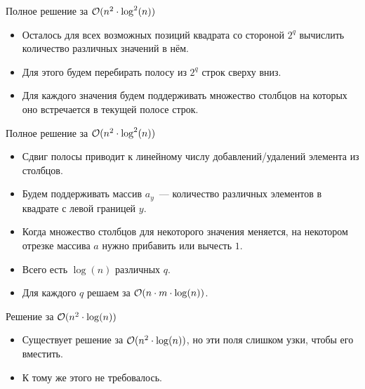 \begin{frame}{Полное решение за $\mathcal{O}(n ^ 2 \cdot \log^2(n))$}
  \begin{itemize}
  \item Осталось для всех возможных позиций квадрата со стороной $2^q$ вычислить количество различных значений в нём.
  \item Для этого будем перебирать полосу из $2^q$ строк сверху вниз.
  \item Для каждого значения будем поддерживать множество столбцов на которых оно встречается в текущей полосе строк.
  \end{itemize}
\end{frame}

\begin{frame}{Полное решение за $\mathcal{O}(n ^ 2 \cdot \log^2(n))$}
  \begin{itemize}
  \item Сдвиг полосы приводит к линейному числу добавлений/удалений элемента из столбцов.
  \item Будем поддерживать массив $a_y$~--- количество различных элементов в квадрате с левой границей $y$.
  \item Когда множество столбцов для некоторого значения меняется, на некотором отрезке массива $a$ нужно прибавить или вычесть $1$.

    \bigskip
    
  \item Всего есть $\log(n)$ различных $q$.
  \item Для каждого $q$ решаем за $\mathcal{O}(n \cdot m \cdot \log(n))$.
    
  \end{itemize}
\end{frame}

\begin{frame}{Решение за $\mathcal{O}(n ^ 2 \cdot \log(n))$}
  \begin{itemize}
  \item Существует решение за $\mathcal{O}(n^2 \cdot \log(n))$, но эти поля слишком узки, чтобы его вместить.
  \item К тому же этого не требовалось.
  \end{itemize}
\end{frame}
